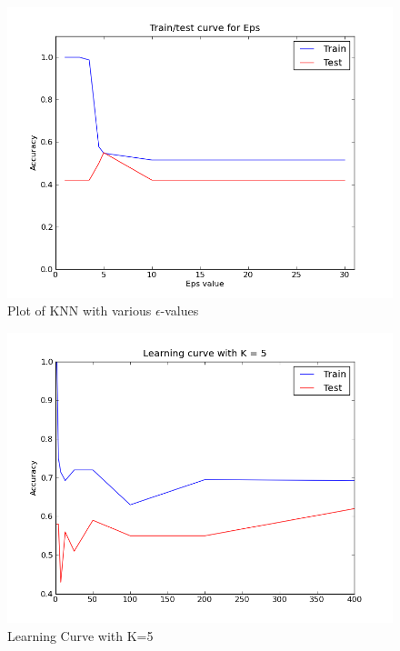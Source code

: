 \begin{figure}
	\caption{Plot of KNN with various $\epsilon$-values}
	\label{fig:epsplot}
	\includegraphics[width=6.5in]{images/knn_eps_plot.png}
\end{figure}

\begin{figure}
	\caption{Learning Curve with K=5}
	\label{fig:learningplot}
	\includegraphics[width=6.5in]{images/knn_learning_curve.png}
\end{figure}

